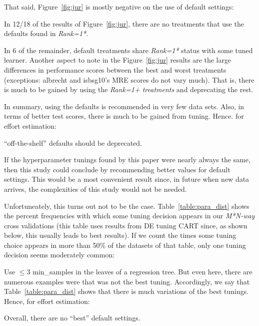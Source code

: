   That said,  Figure~\ref{fig:jur} is mostly negative on the use of default settings:
 \bi
 \item
In   12/18 of the results  of Figure~\ref{fig:jur}, there are
no   treatments that use the defaults found in  {\em Rank=1*}. 
 \item
 In 6  of the remainder, default
 treatments share {\em Rank=1*} status with some tuned learner. 
 \ei
 Another aspect to note in the Figure~\ref{fig:jur} results
 are the large differences in performance scores
 between the best and worst treatments (exceptions: albrecht and  isbsg10's MRE scores do not vary much). That is, there is much to be gained by using the {\em Rank=1+ treatments} and deprecating the rest.
 
 In summary,  using the defaults is recommended in very few
 data sets. Also, in terms of better test scores,
 there is much to be gained   from tuning. Hence. for effort estimation:
 
 \begin{result}{1}
``off-the-shelf'' defaults
 should be deprecated.
 \end{result}
 


 

 
 If the hyperparameter tunings found by this paper
 were nearly always the same, then this study
 could conclude by recommending better values
 for default settings. This would
 be a most convenient result since, 
 in future when new data arrives, the complexities of this study 
 would not be needed.
 
Unfortuneately, this turns out not to be the case.
Table~\ref{table:para_dist} shows the percent frequencies with which
some tuning decision appears in our {\em M*N-way} cross validations
(this table uses results from DE tuning CART since, as shown below,
this usually leads to best results).
If we count the times some tuning choice appears in more than 50\% of the datasets of that table, only one tuning decision seems moderately common:
\bi
\item
Use $\le 3$ min\_samples
in the leaves of a regression tree.
\ei
But even here, there are numerous examples
were that was not the best tuning.
Accordingly, we  say that Table~\ref{table:para_dist} shows that there is
much variations of the best tunings. 
Hence, for effort estimation:

 \begin{result}{2}
 Overall, there are no ``best'' default settings.
 \end{result}


